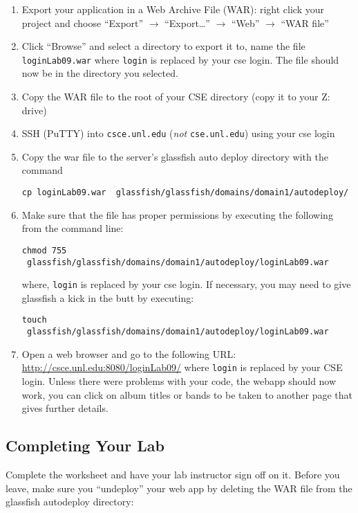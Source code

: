 \documentclass[12pt]{scrartcl}
\begin{document}
\begin{enumerate}
  \item Export your application in a Web Archive File (WAR): right 
    click your project and choose ``Export'' $\rightarrow$ ``Export\ldots'' 
    $\rightarrow$ ``Web'' $\rightarrow$ ``WAR file''
  \item Click ``Browse'' and select a directory to export it to, name 
    the file \texttt{loginLab09.war} where \texttt{login}
    is replaced by your cse login.  The file should now be in the directory
    you selected.
  \item Copy the WAR file to the root of your CSE directory (copy it to 
    your Z: drive) 
  \item SSH (PuTTY) into \texttt{csce.unl.edu} (\emph{not} 
    \texttt{cse.unl.edu}) using your cse login
  \item Copy the war file to the server's glassfish auto deploy 
  	directory with the command
	
	\texttt{cp loginLab09.war ~glassfish/glassfish/domains/domain1/autodeploy/}
	
  \item Make sure that the file has proper permissions by executing 
    the following from the command line:
    
    \texttt{chmod 755 ~glassfish/glassfish/domains/domain1/autodeploy/loginLab09.war}
    
    where, \texttt{login} is replaced by your cse login.
    If necessary, you may need to give glassfish a kick in the butt
    by executing:
    
    \texttt{touch ~glassfish/glassfish/domains/domain1/autodeploy/loginLab09.war}
        
  \item Open a web browser and go to the following URL:
    \url{http://csce.unl.edu:8080/loginLab09/} where 
    \texttt{login} is replaced by your CSE login.
    Unless there were problems with your code, the webapp should now work, 
    you can click on album titles or bands to be taken to another page 
    that gives further details.
\end{enumerate}

\subsection*{Completing Your Lab}

Complete the worksheet and have your lab instructor sign off on it.
Before you leave, make sure you ``undeploy'' your web app by deleting 
the WAR file from the glassfish autodeploy directory:
\end{document}
